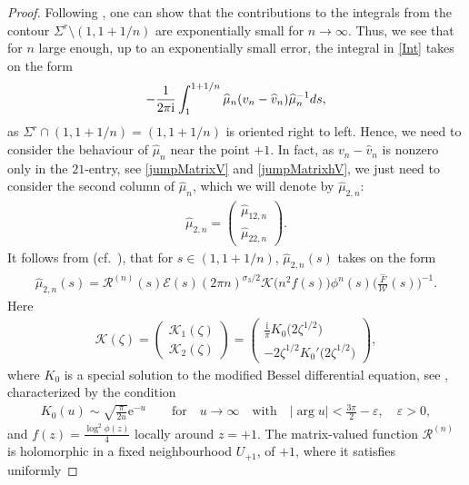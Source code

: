 \documentclass[11pt]{article}
\numberwithin{equation}{section}
\newcommand{\cK}{\mathcal{K}}
\newcommand{\cE}{\mathcal{E}}
\newcommand{\cR}{\mathcal{R}}
\newcommand{\cW}{\mathcal{W}}
\newcommand{\hmu}{{\widehat \mu}}
\newcommand{\bv}{v}
\newcommand{\hv}{{\widehat v}}
\newcommand{\hF}{\widehat F}
\newcommand{\Sigr}{\Sigma^r}
\newcommand{\I}{\mathrm{i}}
\newcommand{\E}{\mathrm{e}}
\numberwithin{equation}{section}
\begin{document}
\begin{proof}
 Following \cite[Proposition~C.3]{CD}, one can show that the contributions to the integrals from the contour $\Sigr \setminus (1,1+1/n)$ are exponentially small for $n \to \infty$. Thus, we see that for $n$ large enough, up to an exponentially small error, the integral in \eqref{Int} takes on the form
\begin{align}\label{localizedIntegral}
 - \frac{1}{2\pi \I}\int_1^{1+1/n} \hmu_n(\bv_n-\hv_n)\hmu_n^{-1} {\rm d}s,
\end{align}
as $\Sigr \cap (1,1+1/n)= (1,1+1/n)$ is oriented right to left. Hence, we need to consider the behaviour of $\hmu_n$ near the point $+1$. In fact, as $\bv_n-\hv_n$ is nonzero only in the $21$-entry, see \eqref{jumpMatrixV} and \eqref{jumpMatrixhV}, we just need to consider the second column of $\hmu_n$, which we will denote by $\hmu_{2,n}$:
\begin{align*}
 \hmu_{2,n} = \begin{pmatrix}
 \hmu_{12,n}
 \\
 \hmu_{22,n}
 \end{pmatrix}.
\end{align*}
It follows from \cite[Section~6, 7]{KMVV} (cf.\ \cite[equation~B.12]{CD}), that for $s \in (1, 1+1/n)$, $\hmu_{2,n}(s)$ takes on the form
\begin{align}\label{explicithmu}
 \hmu_{2,n}(s) = \cR^{(n)}(s)
 \cE(s)(2\pi n)^{\sigma_3/2} \mathcal K\big(n^2 f(s)\big)\phi^n(s)\Big(\frac{\hF}{\cW}(s)\Big)^{-1}.
\end{align}
Here
\begin{align*}
 \mathcal K(\zeta) = \begin{pmatrix}
 \cK_1(\zeta)
 \\
 \cK_2(\zeta)
 \end{pmatrix} = \begin{pmatrix}
 \frac{\I}{\pi}K_0\big(2\zeta^{1/2}\big)
 \\
 -2\zeta^{1/2} K_0'\big(2\zeta^{1/2}\big)
 \end{pmatrix},
\end{align*}
where $K_0$ is a special solution to the modified Bessel differential equation, see \cite[Section~10.25]{DLMF}, characterized by the condition
\begin{align*}
 K_0(u) \sim \sqrt{\frac{\pi}{2u}}\E^{-u} \qquad \text{for} \quad u \to \infty \quad \text{with} \quad |\arg u | < \frac{3\pi}{2} - \varepsilon, \quad \varepsilon > 0,
\end{align*}
and $f(z) = \frac{\log^2 \phi(z)}{4}$ locally around $z = +1$. The matrix-valued function $\cR^{(n)}$ is holomorphic in a fixed neighbourhood $U_{+1}$, of $+1$, where it satisfies uniformly

\end{proof}
\end{document}
